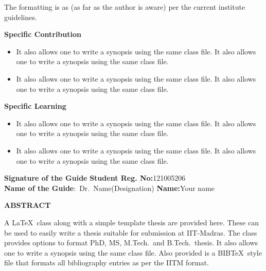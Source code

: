 \documentclass[a4paper, 12pt, oneside]{sastra}
\begin{document}
	The formatting is as (as far as the author is aware) per the current institute guidelines.
	
	\noindent \textbf{Specific Contribution}
	\begin{itemize}
		\item It also allows one to write a synopsis using the same class file. It also allows one to write a synopsis using the same class file.
		\item It also allows one to write a synopsis using the same class file. It also allows one to write a synopsis using the same class file.
	\end{itemize}
	\noindent \textbf{Specific Learning}
	\begin{itemize}
		\item It also allows one to write a synopsis using the same class file. It also allows one to write a synopsis using the same class file.
		\item It also allows one to write a synopsis using the same class file. It also allows one to write a synopsis using the same class file.
	\end{itemize}
	
	\vspace*{24pt}
	
\noindent \textbf{Signature of the Guide} \hspace*{70mm} \textbf{Student Reg. No:}121005206\\
\noindent \textbf{Name of the Guide}:~Dr.~Name(Designation) \hspace*{35mm} \textbf{Name:}Your name
\pagebreak
	
	\begin{center}
		\Large{{\textbf{ABSTRACT}}}
	\end{center}
	
	
	\vspace*{24pt}
	
	\noindent A \LaTeX\ class along with a simple template thesis are provided here.  These can be used to easily write a thesis suitable for submission at IIT-Madras.  The class provides options to format PhD, MS, M.Tech.\ and B.Tech.\ thesis.  It also allows one to write a synopsis using the same class file.  Also provided is a BIB\TeX\ style file that formats all bibliography entries as per the IITM format.
	
\end{document}
